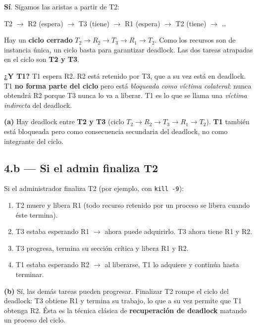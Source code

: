 \documentclass[11pt,a4paper]{article}
\begin{document}
\textbf{Sí}. Sigamos las aristas a partir de T2:

\quad T2 $\to$ R2 (espera) $\to$ T3 (tiene) $\to$ R1 (espera) $\to$ T2 (tiene) $\to$ \ldots

Hay un \textbf{ciclo cerrado} $T_2 \to R_2 \to T_3 \to R_1 \to T_2$.
Como los recursos son de instancia única, un ciclo basta para
garantizar deadlock. Las dos tareas atrapadas en el ciclo son
\textbf{T2 y T3}.

\textbf{¿Y T1?} T1 espera R2. R2 está retenido por T3, que a su vez
está en deadlock. T1 \textbf{no forma parte del ciclo} pero está
\emph{bloqueada como víctima colateral}: nunca obtendrá R2 porque T3
nunca lo va a liberar. T1 es lo que se llama una \emph{víctima
indirecta} del deadlock.

\begin{respuesta}
\textbf{(a)} Hay deadlock entre \textbf{T2 y T3} (ciclo $T_2 \to R_2
\to T_3 \to R_1 \to T_2$). \textbf{T1} también está bloqueada pero
como consecuencia secundaria del deadlock, no como integrante del
ciclo.
\end{respuesta}

\subsection*{4.b --- Si el admin finaliza T2}

Si el administrador finaliza T2 (por ejemplo, con \texttt{kill -9}):

\begin{enumerate}[leftmargin=*,nosep]
    \item T2 muere y libera R1 (todo recurso retenido por un proceso
        se libera cuando éste termina).
    \item T3 estaba esperando R1 $\to$ ahora puede adquirirlo. T3
        ahora tiene R1 y R2.
    \item T3 progresa, termina su sección crítica y libera R1 y R2.
    \item T1 estaba esperando R2 $\to$ al liberarse, T1 lo adquiere y
        continúa hasta terminar.
\end{enumerate}

\begin{respuesta}
\textbf{(b)} Sí, las demás tareas pueden progresar. Finalizar T2
rompe el ciclo del deadlock: T3 obtiene R1 y termina su trabajo, lo
que a su vez permite que T1 obtenga R2. Ésta es la técnica clásica de
\textbf{recuperación de deadlock} matando un proceso del ciclo.
\end{respuesta}
\end{document}
